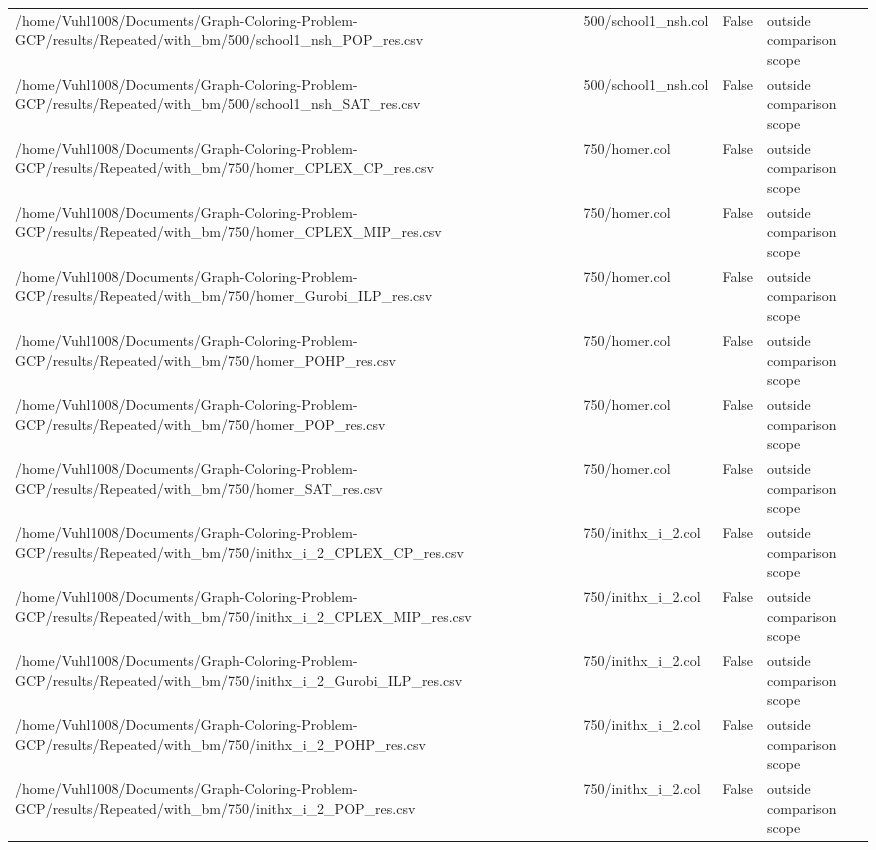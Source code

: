 \begin{table}[htbp]
\begin{tabular}{llll}
/home/Vuhl1008/Documents/Graph-Coloring-Problem-GCP/results/Repeated/with\_bm/500/school1\_nsh\_POP\_res.csv & 500/school1\_nsh.col & False & outside comparison scope \\
/home/Vuhl1008/Documents/Graph-Coloring-Problem-GCP/results/Repeated/with\_bm/500/school1\_nsh\_SAT\_res.csv & 500/school1\_nsh.col & False & outside comparison scope \\
/home/Vuhl1008/Documents/Graph-Coloring-Problem-GCP/results/Repeated/with\_bm/750/homer\_CPLEX\_CP\_res.csv & 750/homer.col & False & outside comparison scope \\
/home/Vuhl1008/Documents/Graph-Coloring-Problem-GCP/results/Repeated/with\_bm/750/homer\_CPLEX\_MIP\_res.csv & 750/homer.col & False & outside comparison scope \\
/home/Vuhl1008/Documents/Graph-Coloring-Problem-GCP/results/Repeated/with\_bm/750/homer\_Gurobi\_ILP\_res.csv & 750/homer.col & False & outside comparison scope \\
/home/Vuhl1008/Documents/Graph-Coloring-Problem-GCP/results/Repeated/with\_bm/750/homer\_POHP\_res.csv & 750/homer.col & False & outside comparison scope \\
/home/Vuhl1008/Documents/Graph-Coloring-Problem-GCP/results/Repeated/with\_bm/750/homer\_POP\_res.csv & 750/homer.col & False & outside comparison scope \\
/home/Vuhl1008/Documents/Graph-Coloring-Problem-GCP/results/Repeated/with\_bm/750/homer\_SAT\_res.csv & 750/homer.col & False & outside comparison scope \\
/home/Vuhl1008/Documents/Graph-Coloring-Problem-GCP/results/Repeated/with\_bm/750/inithx\_i\_2\_CPLEX\_CP\_res.csv & 750/inithx\_i\_2.col & False & outside comparison scope \\
/home/Vuhl1008/Documents/Graph-Coloring-Problem-GCP/results/Repeated/with\_bm/750/inithx\_i\_2\_CPLEX\_MIP\_res.csv & 750/inithx\_i\_2.col & False & outside comparison scope \\
/home/Vuhl1008/Documents/Graph-Coloring-Problem-GCP/results/Repeated/with\_bm/750/inithx\_i\_2\_Gurobi\_ILP\_res.csv & 750/inithx\_i\_2.col & False & outside comparison scope \\
/home/Vuhl1008/Documents/Graph-Coloring-Problem-GCP/results/Repeated/with\_bm/750/inithx\_i\_2\_POHP\_res.csv & 750/inithx\_i\_2.col & False & outside comparison scope \\
/home/Vuhl1008/Documents/Graph-Coloring-Problem-GCP/results/Repeated/with\_bm/750/inithx\_i\_2\_POP\_res.csv & 750/inithx\_i\_2.col & False & outside comparison scope \\

\end{tabular}
\end{table}

